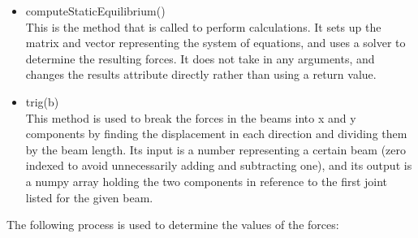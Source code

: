 \documentclass{article}
\begin{document}
\begin{itemize}
\item computeStaticEquilibrium() \\
  This is the method that is called to perform calculations. It sets up the
  matrix and vector representing the system of equations, and uses a solver
  to determine the resulting forces. It does not take in any arguments, and
  changes the results attribute directly rather than using a return value.

\item trig(b) \\
  This method is used to break the forces in the beams into x and y components
  by finding the displacement in each direction and dividing them by the beam
  length. Its input is a number representing a certain beam (zero indexed to
  avoid unnecessarily adding and subtracting one), and its output is a numpy
  array holding the two components in reference to the first joint listed
  for the given beam.
\end{itemize}

The following process is used to determine the values of the forces:
\end{document}
